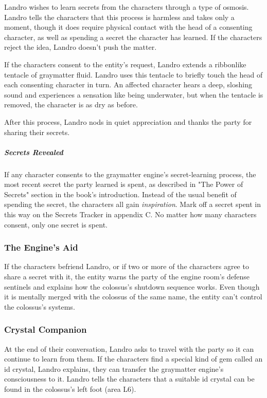 \documentclass[10pt,a4paper,twoside,bg=print,twocolumn,openany,nodeprecatedcode]{dndbook}
\begin{document}
Landro wishes to learn secrets from the characters through a type of osmosis. Landro tells the characters that this process is harmless and takes only a moment, though it does require physical contact with the head of a consenting character, as well as spending a secret the character has learned. If the characters reject the idea, Landro doesn't push the matter.

If the characters consent to the entity's request, Landro extends a ribbonlike tentacle of graymatter fluid. Landro uses this tentacle to briefly touch the head of each consenting character in turn. An affected character hears a deep, sloshing sound and experiences a sensation like being underwater, but when the tentacle is removed, the character is as dry as before.

After this process, Landro nods in quiet appreciation and thanks the party for sharing their secrets.

\subparagraph{Secrets Revealed}
If any character consents to the graymatter engine's secret-learning process, the most recent secret the party learned is spent, as described in "The Power of Secrets" section in the book's introduction. Instead of the usual benefit of spending the secret, the characters all gain \textit{inspiration}. Mark off a secret spent in this way on the Secrets Tracker in appendix C. No matter how many characters consent, only one secret is spent.

\subsubsection{The Engine's Aid}
If the characters befriend Landro, or if two or more of the characters agree to share a secret with it, the entity warns the party of the engine room's defense sentinels and explains how the colossus's shutdown sequence works. Even though it is mentally merged with the colossus of the same name, the entity can't control the colossus's systems.

\subsubsection{Crystal Companion}
At the end of their conversation, Landro asks to travel with the party so it can continue to learn from them. If the characters find a special kind of gem called an id crystal, Landro explains, they can transfer the graymatter engine's consciousness to it. Landro tells the characters that a suitable id crystal can be found in the colossus's left foot (area L6).
\end{document}
